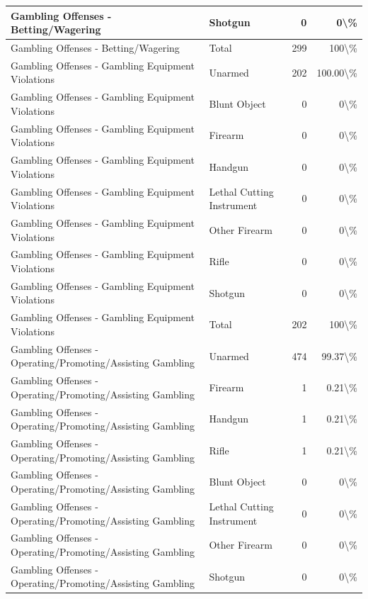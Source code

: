 \documentclass[
]{krantz}
\begin{document}
\begin{longtable}[t]{l|l|r|r}
\hline
Gambling Offenses - Betting/Wagering & Shotgun & 0 & 0\textbackslash{}\%\\
\hline
Gambling Offenses - Betting/Wagering & Total & 299 & 100\textbackslash{}\%\\
\hline
Gambling Offenses - Gambling Equipment Violations & Unarmed & 202 & 100.00\textbackslash{}\%\\
\hline
Gambling Offenses - Gambling Equipment Violations & Blunt Object & 0 & 0\textbackslash{}\%\\
\hline
Gambling Offenses - Gambling Equipment Violations & Firearm & 0 & 0\textbackslash{}\%\\
\hline
Gambling Offenses - Gambling Equipment Violations & Handgun & 0 & 0\textbackslash{}\%\\
\hline
Gambling Offenses - Gambling Equipment Violations & Lethal Cutting Instrument & 0 & 0\textbackslash{}\%\\
\hline
Gambling Offenses - Gambling Equipment Violations & Other Firearm & 0 & 0\textbackslash{}\%\\
\hline
Gambling Offenses - Gambling Equipment Violations & Rifle & 0 & 0\textbackslash{}\%\\
\hline
Gambling Offenses - Gambling Equipment Violations & Shotgun & 0 & 0\textbackslash{}\%\\
\hline
Gambling Offenses - Gambling Equipment Violations & Total & 202 & 100\textbackslash{}\%\\
\hline
Gambling Offenses - Operating/Promoting/Assisting Gambling & Unarmed & 474 & 99.37\textbackslash{}\%\\
\hline
Gambling Offenses - Operating/Promoting/Assisting Gambling & Firearm & 1 & 0.21\textbackslash{}\%\\
\hline
Gambling Offenses - Operating/Promoting/Assisting Gambling & Handgun & 1 & 0.21\textbackslash{}\%\\
\hline
Gambling Offenses - Operating/Promoting/Assisting Gambling & Rifle & 1 & 0.21\textbackslash{}\%\\
\hline
Gambling Offenses - Operating/Promoting/Assisting Gambling & Blunt Object & 0 & 0\textbackslash{}\%\\
\hline
Gambling Offenses - Operating/Promoting/Assisting Gambling & Lethal Cutting Instrument & 0 & 0\textbackslash{}\%\\
\hline
Gambling Offenses - Operating/Promoting/Assisting Gambling & Other Firearm & 0 & 0\textbackslash{}\%\\
\hline
Gambling Offenses - Operating/Promoting/Assisting Gambling & Shotgun & 0 & 0\textbackslash{}\%\\

\end{longtable}
\end{document}
